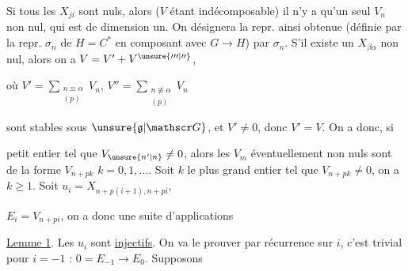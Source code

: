 
Si tous les $X_{ji}$ sont nuls, alors ($V$ étant indécomposable) il n'y a qu'un seul $V_n$ non nul, qui est de dimension un. On désignera la repr. ainsi obtenue (définie par la repr. $\sigma_n$ de $H=C^*$ en composant avec $G\longrightarrow H$) par \uline{$\sigma_n$}. S'il existe un $X_{\beta\alpha}$ non nul, alors  on a $V=V'+V^{\unsure{\prime\prime\prime|\prime\prime}}$,

où $V'=\sum_{\substack{n\equiv\alpha\\(p)}}V_n$, $V''=\sum_{\substack{n\not\equiv\alpha\\(p)}}V_n$

sont stables sous $\unsure{\mathfrak g|\mathscr G}$, et $V'\ne0$, donc $V'=V$.  On a donc, si  

 petit entier tel que $V_{\unsure{n'|n}}\ne0$, alors les $V_m$ éventuellement non nuls  sont de la forme $V_{n+pk}$ $k=0,1,\ldots$. Soit $k$ le plus grand entier tel que $V_{n+pk}\ne0$,  on a $k\geq1$. Soit $u_i=X_{n+p(i+1),n+pi}$,

 $E_i=V_{n+pi}$, on a donc une suite d'applications


\uline{Lemme 1}. Les $u_i$ sont \uline{injectifs}.  On va le prouver par récurrence sur $i$, c'est trivial pour $i=-1$ : $0=E_{-1}\longrightarrow E_0$. Supposons

